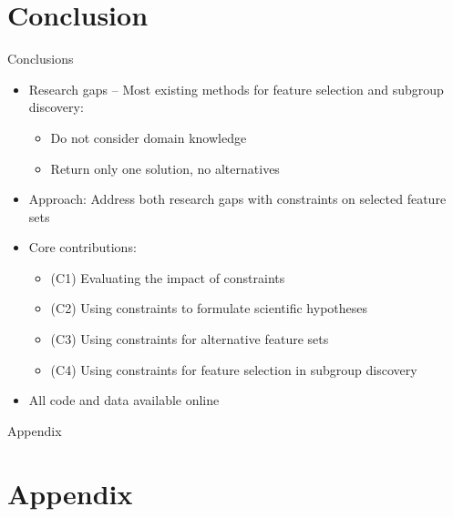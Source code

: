 \documentclass[en, navbarinline, handout]{sdqbeamer}
\begin{document}
\section{Conclusion}

\begin{frame}[t]{Conclusions}
	\begin{itemize}
		\item Research gaps -- Most existing methods for feature selection and subgroup discovery:
		\begin{itemize}
			\item Do not consider domain knowledge
			\item Return only one solution, no alternatives
		\end{itemize}
		\pause
		\vspace{\baselineskip}
		\item Approach: Address both research gaps with constraints on selected feature sets
		\pause
		\vspace{\baselineskip}
		\item Core contributions:
		\begin{itemize}
			\item (C1) Evaluating the impact of constraints \cite{bach2022empirical}
			\item (C2) Using constraints to formulate scientific hypotheses \cite{bach2022empirical}
			\item (C3) Using constraints for alternative feature sets \cite{bach2023finding, bach2024alternative}
			\item (C4) Using constraints for feature selection in subgroup discovery \cite{bach2025subgroup, bach2024using}
		\end{itemize}
		\item All code and data available online
	\end{itemize}
\end{frame}

\appendix
\beginbackup %

\begin{frame}[plain]
	\centering
	\Huge Appendix
\end{frame}

\section{Appendix}
\end{document}
